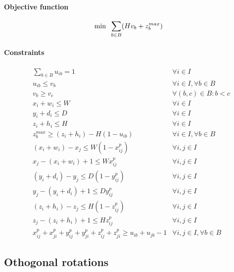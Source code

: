 \paragraph*{Objective function}
\begin{equation}
    \label{eq:objective}
    \min \hspace{.2cm} \sum_{b \in B} (H v_b + z^{max}_b)
\end{equation}

\paragraph*{Constraints}
\begin{eqnarray}
    & \sum_{b \in B}{u_{ib}} = 1 & \forall i \in I  \label{cons:all_items_in_bin} \\
    & u_{ib} \le v_b & \forall i \in I, \forall b \in B \label{cons:items_in_used_bins} \\
    & v_b \ge v_c & \forall (b,c) \in B : b < c  \label{cons:bin_breaking} \\
    & x_i + w_i \le W & \forall i \in I \label{cons:inside_x} \\ 
    & y_i + d_i \le D & \forall i \in I \label{cons:inside_y} \\ 
    & z_i + h_i \le H & \forall i \in I \label{cons:inside_z} \\ 
    & z^{max}_b \ge (z_i + h_i) - H(1-u_{ib}) & \forall i \in I, \forall b \in B \label{cons:maxz} \\
    & (x_i + w_i) - x_j\le W(1 - x^p_{ij}) & \forall i,j \in I \label{cons:x_prec_1} \\
    & x_j - (x_i + w_i) + 1 \le W x^p_{ij} & \forall i,j \in I \label{cons:x_prec_2} \\
    & (y_i + d_i) - y_j \le D(1 - y^p_{ij}) & \forall i,j \in I \label{cons:y_prec_1} \\
    & y_j - (y_i + d_i) + 1 \le D y^p_{ij} & \forall i,j \in I \label{cons:y_prec_2} \\
    & (z_i + h_i) - z_j\le H(1 - z^p_{ij}) & \forall i,j \in I \label{cons:z_prec_1} \\
    & z_j - (z_i + h_i) + 1 \le H z^p_{ij} & \forall i,j \in I \label{cons:z_prec_2} \\
    & x^p_{ij} + x^p_{ji} + y^p_{ij} + y^p_{ji} + z^p_{ij} + z^p_{ji} \ge u_{ib} + u_{jb} - 1 & \forall i,j \in I, \forall b \in B \label{cons:no_overlap}
\end{eqnarray}
\subsection*{Othogonal rotations}

